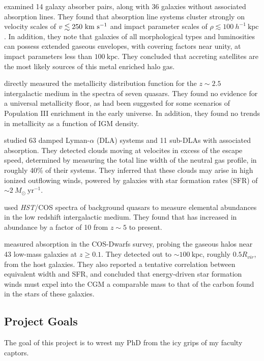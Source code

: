 \cite{Chen2001} examined 14 galaxy absorber pairs, along with 36 galaxies without associated {\CIV} absorption lines. They found that {\CIV} absorption line systems cluster strongly on velocity scales of $v \lesssim 250~\mathrm{\hbox{km~s$^{-1}$}}$ and impact parameter scales of $\rho \lesssim 100~h^{-1}~\mathrm{kpc}$. In addition, they note that galaxies of all morphological types and luminosities can possess extended gaseous envelopes, with covering factors near unity, at impact parameters less than $100~\mathrm{kpc}$. They concluded that accreting satellites are the most likely sources of this metal enriched halo gas.

\cite{Simcoe2004} directly measured the metallicity distribution function for the $z \sim 2.5$ intergalactic medium in the spectra of seven quasars. They found no evidence for a universal metallicity floor, as had been suggested for some scenarios of Population III enrichment in the early universe. In addition, they found no trends in metallicity as a function of IGM density.

\cite{Fox2007} studied 63 damped Lyman-$\alpha$ (DLA) systems and 11 sub-DLAs with associated {\CIV} absorption. They detected {\CIV} clouds moving at velocites in excess of the escape speed, determined by measuring the total line width of the neutral gas profile, in roughly 40\% of their systems. They inferred that these clouds may arise in high ionized outflowing winds, powered by galaxies with star formation rates (SFR) of $\sim 2~M_{\odot}~\mathrm{yr^{-1}}$.

\cite{Shull2014} used {\it HST}/COS spectra of background quasars to measure elemental abundances in the low redshift intergalactic medium. They found that {\CIV} has increased in abundance by a factor of 10 from $z \sim 5$ to present.

\cite{Bordoloi2014} measured {\CIV} absorption in the COS-Dwarfs survey, probing the gaseous halos near 43 low-mass galaxies at $z \ge 0.1$. They detected {\CIV} out to $\sim 100~\mathrm{kpc}$, roughly $0.5 R_{vir}$, from the host galaxies. They also reported a tentative correlation between {\CIV} equivalent width and SFR, and concluded that energy-driven star formation winds must expel into the CGM a comparable mass to that of the carbon found in the stars of these galaxies.

\subsection{Project Goals}
\label{chp1:goals}

The goal of this project is to wrest my PhD from the icy grips of my faculty captors.
